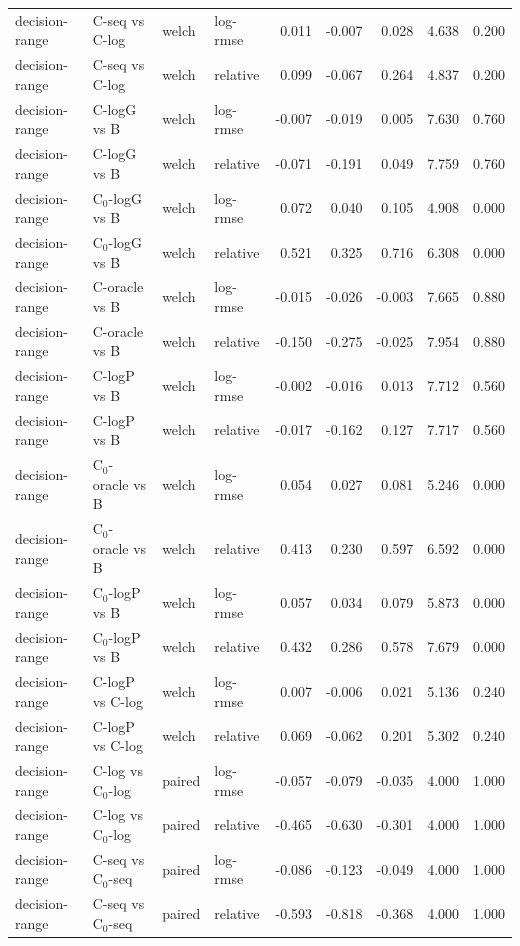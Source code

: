 \begin{longtable}{llllrrrrr}
decision-range & C-seq vs C-log & welch & log-rmse & 0.011 & -0.007 & 0.028 & 4.638 & 0.200 \\
decision-range & C-seq vs C-log & welch & relative & 0.099 & -0.067 & 0.264 & 4.837 & 0.200 \\
decision-range & C-logG vs B & welch & log-rmse & -0.007 & -0.019 & 0.005 & 7.630 & 0.760 \\
decision-range & C-logG vs B & welch & relative & -0.071 & -0.191 & 0.049 & 7.759 & 0.760 \\
decision-range & C$_0$-logG vs B & welch & log-rmse & 0.072 & 0.040 & 0.105 & 4.908 & 0.000 \\
decision-range & C$_0$-logG vs B & welch & relative & 0.521 & 0.325 & 0.716 & 6.308 & 0.000 \\
decision-range & C-oracle vs B & welch & log-rmse & -0.015 & -0.026 & -0.003 & 7.665 & 0.880 \\
decision-range & C-oracle vs B & welch & relative & -0.150 & -0.275 & -0.025 & 7.954 & 0.880 \\
decision-range & C-logP vs B & welch & log-rmse & -0.002 & -0.016 & 0.013 & 7.712 & 0.560 \\
decision-range & C-logP vs B & welch & relative & -0.017 & -0.162 & 0.127 & 7.717 & 0.560 \\
decision-range & C$_0$-oracle vs B & welch & log-rmse & 0.054 & 0.027 & 0.081 & 5.246 & 0.000 \\
decision-range & C$_0$-oracle vs B & welch & relative & 0.413 & 0.230 & 0.597 & 6.592 & 0.000 \\
decision-range & C$_0$-logP vs B & welch & log-rmse & 0.057 & 0.034 & 0.079 & 5.873 & 0.000 \\
decision-range & C$_0$-logP vs B & welch & relative & 0.432 & 0.286 & 0.578 & 7.679 & 0.000 \\
decision-range & C-logP vs C-log & welch & log-rmse & 0.007 & -0.006 & 0.021 & 5.136 & 0.240 \\
decision-range & C-logP vs C-log & welch & relative & 0.069 & -0.062 & 0.201 & 5.302 & 0.240 \\
decision-range & C-log vs C$_0$-log & paired & log-rmse & -0.057 & -0.079 & -0.035 & 4.000 & 1.000 \\
decision-range & C-log vs C$_0$-log & paired & relative & -0.465 & -0.630 & -0.301 & 4.000 & 1.000 \\
decision-range & C-seq vs C$_0$-seq & paired & log-rmse & -0.086 & -0.123 & -0.049 & 4.000 & 1.000 \\
decision-range & C-seq vs C$_0$-seq & paired & relative & -0.593 & -0.818 & -0.368 & 4.000 & 1.000 \\

\end{longtable}
